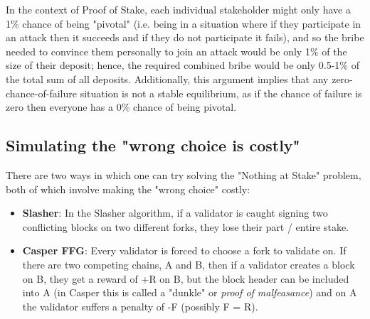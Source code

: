 In the context of Proof of Stake, each individual stakeholder might only have a 1\% chance of being "pivotal" (i.e. being in a situation where if they participate in an attack then it succeeds and if they do not participate it fails), and so the bribe needed to convince them personally to join an attack would be only 1\% of the size of their deposit; hence, the required combined bribe would be only 0.5-1\% of the total sum of all deposits. Additionally, this argument implies that any zero-chance-of-failure situation is not a stable equilibrium, as if the chance of failure is zero then everyone has a 0\% chance of being pivotal.

\subsection{Simulating the "wrong choice is costly"}
There are two ways in which one can try solving the "Nothing at Stake" problem, both of which involve making the "wrong choice" costly:

\begin{itemize}
    \item \textbf{Slasher}: In the Slasher algorithm, if a validator is caught signing two conflicting blocks on two different forks, they lose their part / entire stake. 
    \item \textbf{Casper FFG}: Every validator is forced to choose a fork to validate on. If there are two competing chains, A and B, then if a validator creates a block on B, they get a reward of +R on B, but the block header can be included into A (in Casper this is called a "dunkle" or \emph{proof of malfeasance}) and on A the validator suffers a penalty of -F (possibly F = R). 
\end{itemize}
